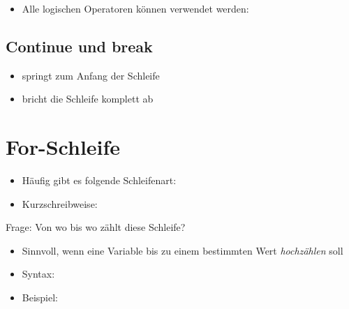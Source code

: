\begin{frame}
	\begin{itemize}
		\item Alle logischen Operatoren können verwendet werden:
	\end{itemize}
\end{frame}

\subsection{Continue und break}
\begin{frame}
	\slidehead

	\begin{itemize}
		\item {} springt zum Anfang der Schleife
		\item {} bricht die Schleife komplett ab
	\end{itemize}
\end{frame}

\subsection{}
\livecoding

\section{For-Schleife}
\begin{frame}
	\slidehead

	\begin{itemize}
		\item Häufig gibt es folgende Schleifenart:

		\pause
		\item Kurzschreibweise:
	\end{itemize}
	\begin{block}{Frage:}
		Von wo bis wo zählt diese Schleife?
	\end{block}
\end{frame}

\begin{frame}
	\slidehead

	\begin{itemize}
		\item Sinnvoll, wenn eine Variable bis zu einem bestimmten Wert \textit{hochzählen} soll
		\item Syntax:
		\item Beispiel:
	\end{itemize}
\end{frame}

